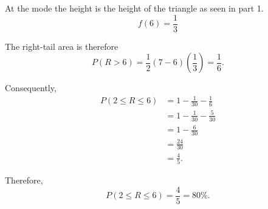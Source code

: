{		At the mode the height is the height of the triangle as seen in part 1.
		\[
		f(6)
		=
		\frac{1}{3}		\]
		
		The right-tail area is therefore
		\[
		P(R>6)
		=
		\frac12(7-6)\left(\frac13\right)
		=
		\frac16.
		\]
		
		Consequently,
		\[
		\begin{aligned}
			P(2\le R\le6)
			&=
			1-\frac1{30}-\frac16
			\\
			&=
			1-\frac1{30}-\frac5{30}
			\\
			&=
			1-\frac6{30}
			\\
			&=
			\frac{24}{30}
			\\
			&=
			\frac45.
		\end{aligned}
		\]
		
		Therefore,
		\[
		\boxed{P(2\le R\le6)=\frac45=80\%}.
		\]
		
		
		
		\vspace{-5mm}
		
	}
	
